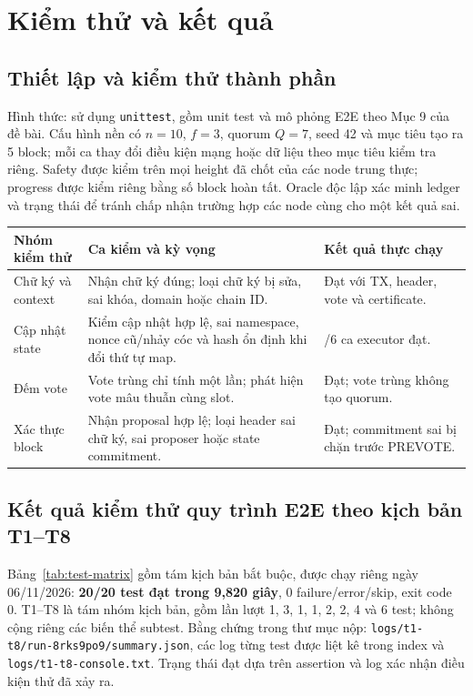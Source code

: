\section{Kiểm thử và kết quả}
\label{sec:testing}

\subsection{Thiết lập và kiểm thử thành phần}

Hình thức: sử dụng \texttt{unittest}, gồm unit test và mô phỏng E2E theo Mục 9 của đề bài. Cấu hình nền có $n=10$, $f=3$, quorum $Q=7$, seed 42 và mục tiêu tạo ra 5 block; mỗi ca thay đổi điều kiện mạng hoặc dữ liệu theo mục tiêu kiểm tra riêng. Safety được kiểm trên mọi height đã chốt của các node trung thực; progress được kiểm riêng bằng số block hoàn tất. Oracle độc lập xác minh ledger và trạng thái để tránh chấp nhận trường hợp các node cùng cho một kết quả sai.

\begingroup
\small
\setlength{\tabcolsep}{4pt}
\renewcommand{\arraystretch}{1.12}
\noindent\begin{tabularx}{\textwidth}{@{}>{\raggedright\arraybackslash}p{2.5cm}>{\raggedright\arraybackslash}X>{\raggedright\arraybackslash}p{4.4cm}@{}}
\toprule
\textbf{Nhóm kiểm thử} & \textbf{Ca kiểm và kỳ vọng} & \textbf{Kết quả thực chạy} \\
\midrule
Chữ ký và context & Nhận chữ ký đúng; loại chữ ký bị sửa, sai khóa, domain hoặc chain ID. & Đạt với TX, header, vote và certificate. \\
\addlinespace
Cập nhật state & Kiểm cập nhật hợp lệ, sai namespace, nonce cũ/nhảy cóc và hash ổn định khi đổi thứ tự map. & 6/6 ca executor đạt. \\
\addlinespace
Đếm vote & Vote trùng chỉ tính một lần; phát hiện vote mâu thuẫn cùng slot. & Đạt; vote trùng không tạo quorum. \\
\addlinespace
Xác thực block & Nhận proposal hợp lệ; loại header sai chữ ký, sai proposer hoặc state commitment. & Đạt; commitment sai bị chặn trước PREVOTE. \\
\bottomrule
\end{tabularx}
\endgroup

\subsection{Kết quả kiểm thử quy trình E2E theo kịch bản T1--T8}

Bảng~\ref{tab:test-matrix} gồm tám kịch bản bắt buộc, được chạy riêng ngày 06/11/2026: \textbf{20/20 test đạt trong 9,820 giây}, 0 failure/error/skip, exit code 0. T1--T8 là tám nhóm kịch bản, gồm lần lượt 1, 3, 1, 1, 2, 2, 4 và 6 test; không cộng riêng các biến thể subtest. Bằng chứng trong thư mục nộp: \texttt{logs/t1-t8/run-8rks9po9/summary.json}, các log từng test được liệt kê trong index và \texttt{logs/t1-t8-console.txt}. Trạng thái đạt dựa trên assertion và log xác nhận điều kiện thử đã xảy ra.

